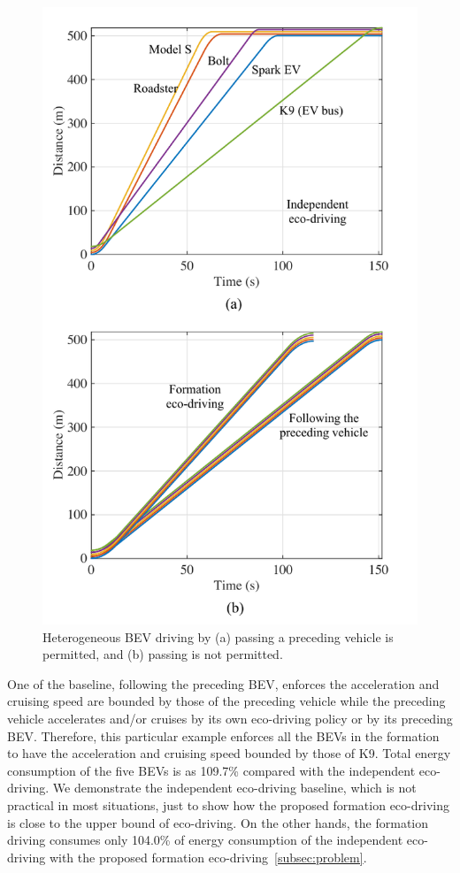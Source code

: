 \documentclass{IEEEtran}
\begin{document}
\begin{figure}	%
\centering
\includegraphics[width=0.9\hsize]{Figures/Heterogeneous_driving.pdf}
\caption{Heterogeneous BEV driving by (a) passing a preceding vehicle is permitted, and (b) passing is not permitted.}
\label{fig:hetero_driving}
\end{figure} 


One of the baseline, following the preceding BEV, enforces the acceleration and cruising speed are bounded by those of the preceding vehicle while the preceding vehicle accelerates and/or cruises by its own eco-driving policy or by its preceding BEV. Therefore, this particular example enforces all the BEVs in the formation to have the acceleration and cruising speed bounded by those of K9. Total energy consumption of the five BEVs is as 109.7\% compared with the independent eco-driving. We demonstrate the independent eco-driving baseline, which is not practical in most situations, just to show how the proposed formation eco-driving is close to the upper bound of eco-driving.
On the other hands, the formation driving consumes only 104.0\% of energy consumption of the independent eco-driving with the proposed formation eco-driving~\ref{subsec:problem}.
\end{document}
